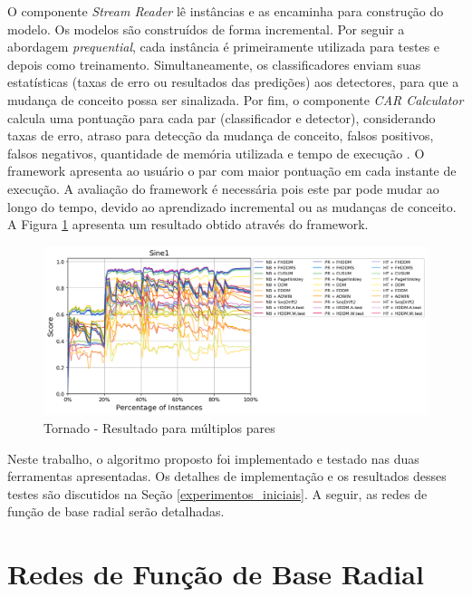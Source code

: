 \documentclass[qual, classic, a4paper]{ufbathesis}
\begin{document}
O componente \textit{Stream Reader} lê instâncias e as encaminha para construção do modelo.
Os modelos são construídos de forma incremental. Por seguir a abordagem \textit{prequential}, cada instância é primeiramente utilizada para testes e depois como treinamento.
Simultaneamente, os classificadores enviam suas estatísticas (taxas de erro ou resultados das predições) aos detectores, para que a mudança de conceito possa ser sinalizada.
Por fim, o componente \textit{CAR Calculator} calcula uma pontuação para cada par (classificador e detector), considerando taxas de erro, atraso para detecção da mudança de conceito, falsos positivos, falsos negativos, quantidade de memória utilizada e tempo de execução \cite{Pesaranghader:Tornado}.
O framework apresenta ao usuário o par com maior pontuação em cada instante de execução. 
A avaliação do framework é necessária pois este par pode mudar ao longo do tempo, devido ao aprendizado incremental ou as mudanças de conceito.
A Figura \ref{fig:tornado_out2} apresenta um resultado obtido através do framework.

\begin{figure}[H]
\begin{center}
    \includegraphics[scale=0.6]{imagens/tornado_out2.png}
    \caption{Tornado - Resultado para múltiplos pares \cite{Pesaranghader:Tornado}}
    \label{fig:tornado_out2}
\end{center}
\end{figure}

Neste trabalho, o algoritmo proposto foi implementado e testado nas duas ferramentas apresentadas.
Os detalhes de implementação e os resultados desses testes são discutidos na Seção \ref{experimentos_iniciais}.
A seguir, as redes de função de base radial serão detalhadas.

\section{Redes de Função de Base Radial}
\end{document}
